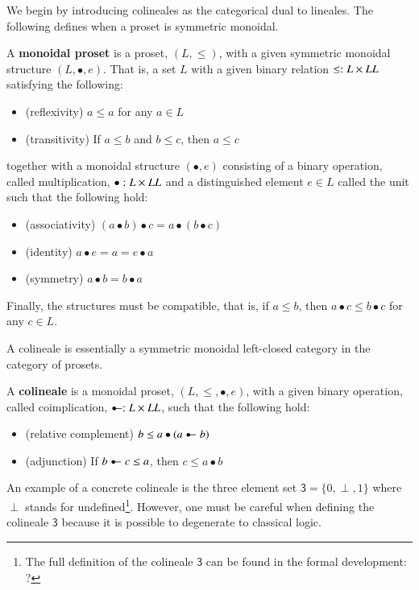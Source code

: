 \documentclass{llncs}
\let\to\relax
\newcommand{\to}{\rightarrow}
\newcommand{\colimp}[0]{\multimapdotinv}
\begin{document}
We begin by introducing colineales as the categorical dual to
lineales. The following defines when a proset is symmetric monoidal.
\begin{definition}
  \label{def:monoidal-proset}
  A \textbf{monoidal proset} is a proset, $(L, \leq)$, with a given
  symmetric monoidal structure $(L, \bullet, e)$.  That is, a set $L$
  with a given binary relation $\leq : L \times L \to L$ satisfying
  the following:
  \begin{itemize}
  \item (reflexivity) $a \leq a$ for any $a \in L$
  \item (transitivity) If $a \leq b$ and $b \leq c$, then $a \leq c$
  \end{itemize}
  together with a monoidal structure $(\bullet, e)$ consisting of a
  binary operation, called multiplication, $\bullet : L \times L \to L$
  and a distinguished element $e \in L$ called the unit such that the
  following hold:
  \begin{itemize}
  \item (associativity) $(a \bullet b) \bullet c = a \bullet (b \bullet c)$
  \item (identity) $a \bullet e = a = e \bullet a$
  \item (symmetry) $a \bullet b = b \bullet a$
  \end{itemize}
  Finally, the structures must be compatible, that is, if $a \leq b$,
  then $a \bullet c \leq b \bullet c$ for any $c \in L$.
\end{definition}
A colineale is essentially a symmetric monoidal left-closed
category in the category of prosets.
\begin{definition}
  \label{def:lineale}
  A \textbf{colineale} is a monoidal proset, $(L, \leq, \bullet, e)$, with
  a given binary operation, called coimplication, $\colimp : L \times L
  \to L$, such that the following hold:
  \begin{itemize}
  \item (relative complement) $b \leq a \bullet (a \colimp b)$
  \item (adjunction) If $b \colimp c \leq a$, then $c \leq a \bullet b$
  \end{itemize}
\end{definition}
An example of a concrete colineale is the three element set
$\mathsf{3} = \{0,\perp,1\}$ where $\perp$ stands for
undefined\footnote{The full definition of the colineale $\mathsf{3}$
  can be found in the formal development: ?}.  However, one must be
careful when defining the colineale $\mathsf{3}$ because it is
possible to degenerate to classical logic.
\end{document}
